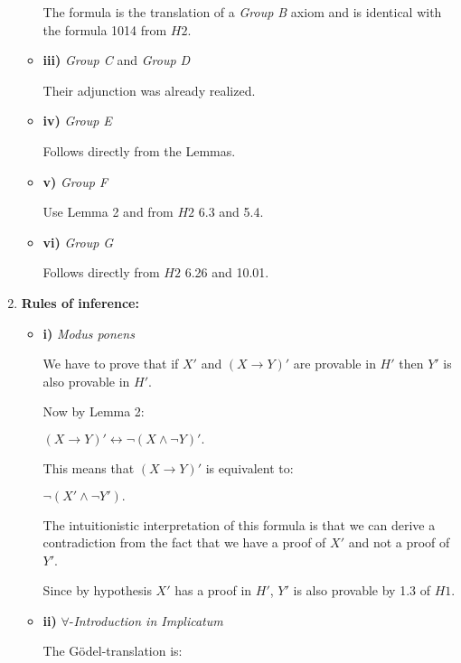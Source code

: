 \documentclass[12pt]{article}
\begin{document}
\begin{enumerate}
\begin{itemize}
The formula is the translation of a \emph{Group B} axiom and is identical with the formula 1014 from $H2$. 

\item \textbf{iii)} \emph{Group C} and \emph{Group D}
 
Their adjunction was already realized.

\item \textbf{iv)} \emph{Group E}
 
Follows directly from the Lemmas.

\item \textbf{v)} \emph{Group F}

Use Lemma 2 and from $H2$ 6.3 and 5.4.

\item \textbf{vi)} \emph{Group G}

Follows directly from $H2$ 6.26 and 10.01.

\end{itemize}

\item \textbf{Rules of inference:}

\begin{itemize}

\item \textbf{i)} \emph{Modus ponens}

We have to prove that if $X'$ and $(X \rightarrow Y)'$ are provable in $H'$ then $Y'$ is also provable in $H'$.

Now by Lemma 2:

\begin{center}
$(X \rightarrow Y)' \leftrightarrow \neg (X \wedge\neg Y)'.$
\end{center}

This means that $(X \rightarrow Y)'$ is equivalent to:

\begin{center}
$\neg (X' \wedge \neg Y').$ 
\end{center}
 
The intuitionistic interpretation of this formula is that we can derive a contradiction from the fact that we have a proof of $X'$ and not a proof of $Y'$.
 
Since by hypothesis $X'$ has a proof in $H'$, $Y'$ is also provable by 1.3 of $H1$.
 
\item \textbf{ii)} $\forall$-\emph{Introduction in Implicatum}

The G\"{o}del-translation is:


\end{itemize}
\end{enumerate}
\end{document}
